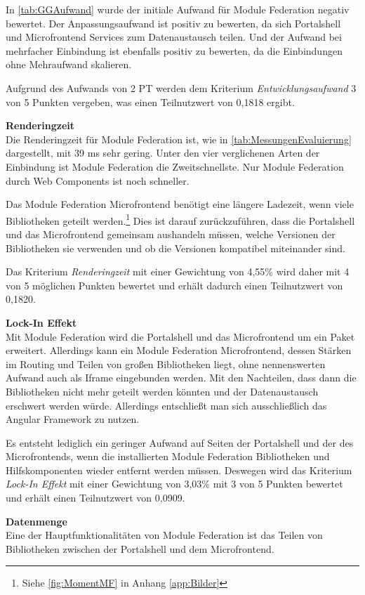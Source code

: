 In \cref{tab:GGAufwand} wurde der initiale Aufwand für Module Federation negativ bewertet. Der Anpassungsaufwand ist positiv zu bewerten, da sich Portalshell und Microfrontend Services zum Datenaustausch teilen. Und der Aufwand bei mehrfacher Einbindung ist ebenfalls positiv zu bewerten, da die Einbindungen ohne Mehraufwand skalieren.

Aufgrund des Aufwands von 2 \gls{PT} werden dem Kriterium \textit{Entwicklungsaufwand} 3 von 5 Punkten vergeben, was einen Teilnutzwert von 0,1818 ergibt.

\textbf{Renderingzeit}\\
Die Renderingzeit für Module Federation ist, wie in \cref{tab:MessungenEvaluierung} dargestellt, mit 39 ms sehr gering. Unter den vier verglichenen Arten der Einbindung ist Module Federation die Zweitschnellste. Nur Module Federation durch Web Components ist noch schneller.

Das Module Federation Microfrontend benötigt eine längere Ladezeit, wenn viele Bibliotheken geteilt werden.\footnote{Siehe \cref{fig:MomentMF} in Anhang \ref{app:Bilder}} Dies ist darauf zurückzuführen, dass die Portalshell und das Microfrontend gemeinsam aushandeln müssen, welche Versionen der Bibliotheken sie verwenden und ob die Versionen kompatibel miteinander sind.

Das Kriterium \textit{Renderingzeit} mit einer Gewichtung von 4,55\% wird daher mit 4 von 5 möglichen Punkten bewertet und erhält dadurch einen Teilnutzwert von 0,1820.

\textbf{Lock-In Effekt}\\
Mit Module Federation wird die Portalshell und das Microfrontend um ein Paket erweitert. Allerdings kann ein Module Federation Microfrontend, dessen Stärken im Routing und Teilen von großen Bibliotheken liegt, ohne nennenswerten Aufwand auch als Iframe eingebunden werden. Mit den Nachteilen, dass dann die Bibliotheken nicht mehr geteilt werden könnten und der Datenaustausch erschwert werden würde. Allerdings entschließt man sich ausschließlich das Angular Framework zu nutzen.

Es entsteht lediglich ein geringer Aufwand auf Seiten der Portalshell und der des Microfrontends, wenn die installierten Module Federation Bibliotheken und Hilfskomponenten wieder entfernt werden müssen. Deswegen wird das Kriterium \textit{Lock-In Effekt} mit einer Gewichtung von 3,03\% mit 3 von 5 Punkten bewertet und erhält einen Teilnutzwert von 0,0909.

\textbf{Datenmenge}\\
Eine der Hauptfunktionalitäten von Module Federation ist das Teilen von Bibliotheken zwischen der Portalshell und dem Microfrontend. 

